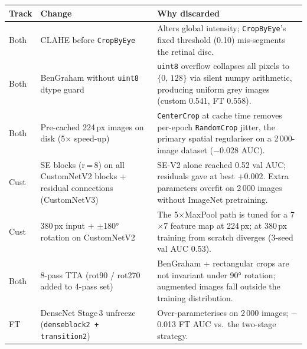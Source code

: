 \documentclass[a4paper, 10pt, twocolumn]{article}
\begin{document}
\label{tab:abl}
\vspace{3pt}
\footnotesize
\setlength{\tabcolsep}{4pt}
\renewcommand{\arraystretch}{1.18}
\begin{tabularx}{\textwidth}{@{}p{0.85cm} p{5.4cm} X@{}}
\toprule
\textbf{Track} & \textbf{Change} & \textbf{Why discarded} \\
\midrule

Both
  & CLAHE before \texttt{CropByEye}
  & Alters global intensity; \texttt{CropByEye}'s fixed threshold (0.10)
    mis-segments the retinal disc. \\

Both
  & BenGraham without \texttt{uint8} dtype guard
  & \texttt{uint8} overflow collapses all pixels to $\{0,\,128\}$ via silent
    numpy arithmetic, producing uniform grey images (custom 0.541, FT 0.558). \\

Both
  & Pre-cached 224\,px images on disk (5$\times$ speed-up)
  & \texttt{CenterCrop} at cache time removes per-epoch \texttt{RandomCrop}
    jitter, the primary spatial regulariser on a 2\,000-image dataset ($-$0.028 AUC). \\

Cust
  & SE blocks (r\,=\,8) on all CustomNetV2 blocks + residual connections (CustomNetV3)
  & SE-V2 alone reached 0.52 val AUC; residuals gave at best $+$0.002.
    Extra parameters overfit on 2\,000 images without ImageNet pretraining. \\

Cust
  & 380\,px input + $\pm$180° rotation on CustomNetV2
  & The 5$\times$MaxPool path is tuned for a 7$\times$7 feature map at 224\,px;
    at 380\,px training from scratch diverges (3-seed val AUC 0.53). \\

Both
  & 8-pass TTA (rot90 / rot270 added to 4-pass set)
  & BenGraham + rectangular crops are not invariant under 90° rotation;
    augmented images fall outside the training distribution. \\

FT
  & DenseNet Stage\,3 unfreeze (\texttt{denseblock2 + transition2})
  & Over-parameterises on 2\,000 images; $-$0.013 FT AUC vs.\ the two-stage strategy. \\

\bottomrule
\end{tabularx}
\end{document}
